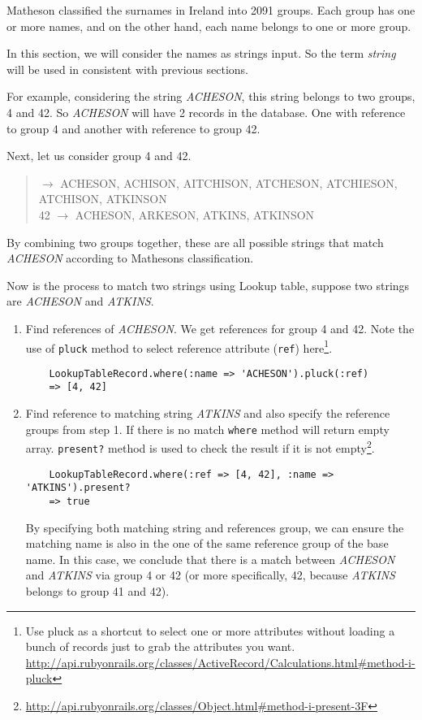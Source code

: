 Matheson classified the surnames in Ireland into 2091 groups.
Each group has one or more names, and on the other hand,
each name belongs to one or more group.

In this section, we will consider the names as strings input.
So the term \emph{string} will be used in consistent with
previous sections.

For example, considering the string \emph{ACHESON}, this string
belongs to two groups, 4 and 42. So \emph{ACHESON} will have
2 records in the database. One with reference to group 4
and another with reference to group 42.

Next, let us consider group 4 and 42.

\begin{quotation}  $\rightarrow$ ACHESON, ACHISON, AITCHISON, ATCHESON, ATCHIESON, ATCHISON, ATKINSON \\
42 $\rightarrow$ ACHESON, ARKESON, ATKINS, ATKINSON
\end{quotation}

By combining two groups together, these are all possible strings
that match \emph{ACHESON} according to Matheson\textquotesingle s classification.

Now is the process to match two strings using Lookup table,
suppose two strings are \emph{ACHESON} and \emph{ATKINS}.

\begin{enumerate}
  \item Find references of \emph{ACHESON}. We get references for group 4 and 42.
    Note the use of \texttt{pluck} method to select reference attribute (\texttt{ref})
    here\footnote{Use pluck as a shortcut to select one or more attributes
      without loading a bunch of records just to grab the attributes you want.
    \url{http://api.rubyonrails.org/classes/ActiveRecord/Calculations.html\#method-i-pluck}}.
    \begin{lstlisting}
    LookupTableRecord.where(:name => 'ACHESON').pluck(:ref)
    => [4, 42]
    \end{lstlisting}
  \item Find reference to matching string \emph{ATKINS} and also specify
    the reference groups from step 1. If there is no match \texttt{where} method
    will return empty array. \texttt{present?} method is used to
    check the result if it is not empty\footnote{\url{http://api.rubyonrails.org/classes/Object.html\#method-i-present-3F}}.
    \begin{lstlisting}
    LookupTableRecord.where(:ref => [4, 42], :name => 'ATKINS').present?
    => true
    \end{lstlisting}
    By specifying both matching string and references group, we can ensure
    the matching name is also in the one of the same reference group
    of the base name. In this case, we conclude that there is a match
    between \emph{ACHESON} and \emph{ATKINS} via group 4 or 42
    (or more specifically, 42, because \emph{ATKINS} belongs to group 41 and 42).
\end{enumerate}

